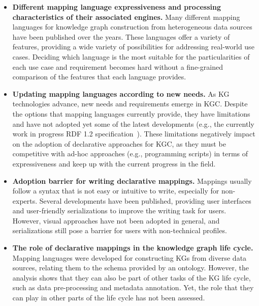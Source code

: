 \begin{itemize}
    \item \textbf{Different mapping language expressiveness and processing characteristics of their associated engines.} Many different mapping languages for knowledge graph construction from heterogeneous data sources have been published over the years. These languages offer a variety of features, providing a wide variety of possibilities for addressing real-world use cases. Deciding which language is the most suitable for the particularities of each use case and requirement becomes hard without a fine-grained comparison of the features that each language provides. 
    
    \item \textbf{Updating mapping languages according to new needs.} As KG technologies advance, new needs and requirements emerge in KGC. Despite the options that mapping languages currently provide, they have limitations and have not adopted yet some of the latest developments (e.g., the currently work in progress RDF 1.2 specification~\parencite{hartig2023rdf}). These limitations negatively impact on the adoption of declarative approaches for KGC, as they must be competitive with ad-hoc approaches (e.g., programming scripts) in terms of expressiveness and keep up with the current progress in the field.
    
    \item \textbf{Adoption barrier for writing declarative mappings.} Mappings usually follow a syntax that is not easy or intuitive to write, especially for non-experts. Several developments have been published, providing user interfaces and user-friendly serializations to improve the writing task for users. However, visual approaches have not been adopted in general, and serializations still pose a barrier for users with non-technical profiles. 

    
    \item \textbf{The role of declarative mappings in the knowledge graph life cycle.} Mapping languages were developed for constructing KGs from diverse data sources, relating them to the schema provided by an ontology. However, the analysis shows that they can also be part of other tasks of the KG life cycle, such as data pre-processing and metadata annotation. Yet, the role that they can play in other parts of the life cycle has not been assessed. 
\end{itemize}
